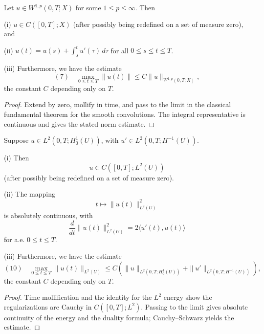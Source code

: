 \begin{theorem}
\label{thm:calculus-abstract-space}
Let $u \in W^{1,p}(0,T;X)$ for some $1 \le p \le \infty$. Then

(i) $u \in C([0,T];X)$ (after possibly being redefined on a set of measure zero), and

(ii) $u(t) = u(s) + \int_s^t u'(\tau) \, d\tau$ for all $0 \le s \le t \le T$.

(iii) Furthermore, we have the estimate
$$(7) \quad \max_{0 \le t \le T} \|u(t)\| \le C\|u\|_{W^{1,p}(0,T;X)},$$
the constant $C$ depending only on $T$.
\end{theorem}

\begin{proof}
\sketch Extend by zero, mollify in time, and pass to the limit in the classical fundamental theorem for the smooth convolutions. The integral representative is continuous and gives the stated norm estimate.
\end{proof}

\begin{theorem}
\label{thm:more-calculus-h1-hminus1}
Suppose $u \in L^2(0,T;H_0^1(U))$, with $u' \in L^2(0,T;H^{-1}(U))$.

(i) Then
$$u \in C([0,T];L^2(U))$$
(after possibly being redefined on a set of measure zero).

(ii) The mapping
$$t \mapsto \|u(t)\|^2_{L^2(U)}$$
is absolutely continuous, with
$$\frac{d}{dt}\|u(t)\|^2_{L^2(U)} = 2\langle u'(t), u(t)\rangle$$
for a.e. $0 \le t \le T$.

(iii) Furthermore, we have the estimate
$$(10) \quad \max_{0 \le t \le T} \|u(t)\|_{L^2(U)} \le C\left(\|u\|_{L^2(0,T;H_0^1(U))} + \|u'\|_{L^2(0,T;H^{-1}(U))}\right),$$
the constant $C$ depending only on $T$.
\end{theorem}

\begin{proof}
\sketch Time mollification and the identity for the $L^2$ energy show the regularizations are Cauchy in $C([0,T];L^2)$. Passing to the limit gives absolute continuity of the energy and the duality formula; Cauchy--Schwarz yields the estimate.
\end{proof}

